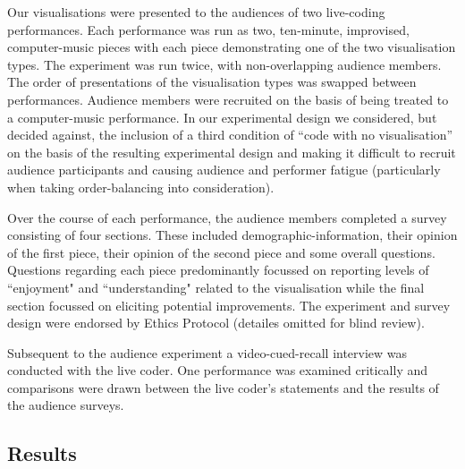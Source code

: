 \documentclass{sig-alternate}
\begin{document}
Our visualisations were presented to the audiences of two live-coding performances. Each performance was run as two, ten-minute, improvised, computer-music pieces with each piece demonstrating one of the two visualisation types. The experiment was run twice, with non-overlapping audience members. The order of presentations of the visualisation types was swapped between performances. Audience members were recruited on the basis of being treated to a computer-music performance. In our experimental design we considered, but decided against, the inclusion of a third condition of ``code with no visualisation'' on the basis of the resulting experimental design and making it difficult to recruit audience participants and causing audience and performer fatigue (particularly when taking order-balancing into consideration). 

Over the course of each performance, the audience members completed a survey consisting of four sections. These included demographic-information, their opinion of the first piece, their opinion of the second piece and some overall questions. 
Questions regarding each piece predominantly focussed on reporting levels of ``enjoyment" and ``understanding" related to the visualisation while the final section focussed on eliciting potential improvements. The experiment and survey design were endorsed by Ethics Protocol (detailes omitted for blind review).


Subsequent to the audience experiment a video-cued-recall interview was conducted with the live coder. One performance was examined critically and comparisons were drawn between the live coder's statements and the results of the audience surveys.

\subsection{Results}
\end{document}
